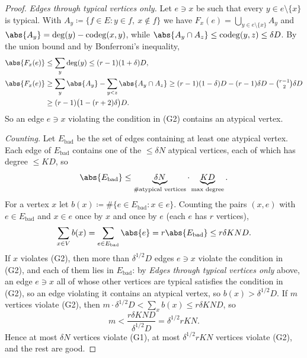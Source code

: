 \begin{proof}
    \emph{Edges through typical vertices only.} Let \(e \ni x\) be such that every \(y \in e \setminus \{x\}\) is typical. With \(A_{y} \coloneqq \{ f \in E : y \in f,\ x \notin f \}\) we have \(F_{x}(e) = \bigcup_{y \in e \setminus \{x\}} A_{y}\) and \(\abs{A_{y}} = \deg(y) - \operatorname{codeg}(x,y)\), while \(\abs{A_{y} \cap A_{z}} \le \operatorname{codeg}(y,z) \le \delta D\). By the union bound and by Bonferroni's inequality,
    \[
        \begin{aligned}
            \abs{F_{x}(e)} &\le \sum_{y} \deg(y) \le (r-1)(1 + \delta) D, \\
            \abs{F_{x}(e)} &\ge \sum_{y} \abs{A_{y}} - \sum_{y < z} \abs{A_{y} \cap A_{z}}
            \ge (r-1)(1 - \delta) D - (r-1)\delta D - \tbinom{r-1}{2} \delta D \\
            &\ge (r-1)\bigl( 1 - (r+2)\delta \bigr) D .
        \end{aligned}
    \]
    So an edge \(e \ni x\) violating the condition in (G2) contains an atypical vertex.

    \emph{Counting.} Let \(E_{\mathrm{bad}}\) be the set of edges containing at least one atypical vertex. Each edge of \(E_{\mathrm{bad}}\) contains one of the \(\le \delta N\) atypical vertices, each of which has degree \(\le KD\), so
    \[
        \abs{E_{\mathrm{bad}}} \le \underbrace{\delta N}_{\#\text{atypical vertices}} \cdot \underbrace{K D}_{\text{max degree}} .
    \]
    For a vertex \(x\) let \(b(x) \coloneqq \#\{ e \in E_{\mathrm{bad}} : x \in e \}\). Counting the pairs \((x, e)\) with \(e \in E_{\mathrm{bad}}\) and \(x \in e\) once by \(x\) and once by \(e\) (each \(e\) has \(r\) vertices),
    \[
        \sum_{x \in V} b(x) = \sum_{e \in E_{\mathrm{bad}}} \abs{e} = r \abs{E_{\mathrm{bad}}} \le r \delta K N D .
    \]
    If \(x\) violates (G2), then more than \(\delta^{1/2} D\) edges \(e \ni x\) violate the condition in (G2), and each of them lies in \(E_{\mathrm{bad}}\): by \emph{Edges through typical vertices only} above, an edge \(e \ni x\) all of whose other vertices are typical satisfies the condition in (G2), so an edge violating it contains an atypical vertex, so \(b(x) > \delta^{1/2} D\). If \(m\) vertices violate (G2), then \(m \cdot \delta^{1/2} D < \sum_{x} b(x) \le r\delta KND\), so
    \[
        m < \frac{r \delta K N D}{\delta^{1/2} D} = \delta^{1/2} r K N .
    \]
    Hence at most \(\delta N\) vertices violate (G1), at most \(\delta^{1/2} r K N\) vertices violate (G2), and the rest are good.
\end{proof}

